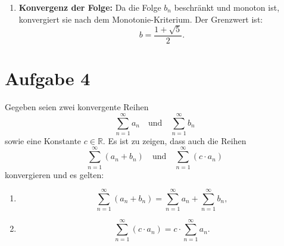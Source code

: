 \documentclass[11pt]{article}
\begin{document}
\begin{enumerate}
\begin{enumerate}
    \item \textbf{Konvergenz der Folge:} Da die Folge \( b_n \) beschränkt und monoton ist, konvergiert sie nach dem Monotonie-Kriterium. Der Grenzwert ist:
    \[
    b = \frac{1 + \sqrt{5}}{2}.
    \]
\end{enumerate}
\end{enumerate}

\section*{Aufgabe 4}
Gegeben seien zwei konvergente Reihen
\[
\sum_{n=1}^\infty a_n \quad \text{und} \quad \sum_{n=1}^\infty b_n
\]
sowie eine Konstante \( c \in \mathbb{R} \). Es ist zu zeigen, dass auch die Reihen
\[
\sum_{n=1}^\infty (a_n + b_n) \quad \text{und} \quad \sum_{n=1}^\infty (c \cdot a_n)
\]
konvergieren und es gelten:
\begin{enumerate}[label=(\alph*)]
    \item \[
        \sum_{n=1}^\infty (a_n + b_n) = \sum_{n=1}^\infty a_n + \sum_{n=1}^\infty b_n,
    \]
    \item \[
        \sum_{n=1}^\infty (c \cdot a_n) = c \cdot \sum_{n=1}^\infty a_n.
    \]
\end{enumerate}
\end{document}
